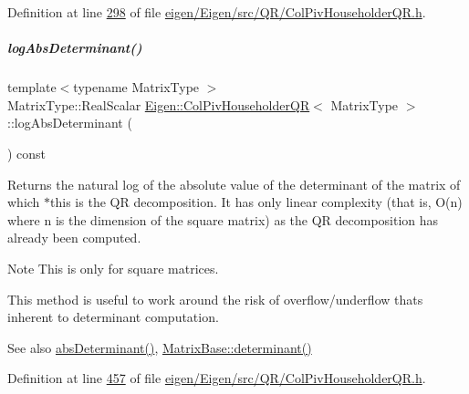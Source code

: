 Definition at line \hyperlink{eigen_2_eigen_2src_2_q_r_2_col_piv_householder_q_r_8h_source_l00298}{298} of file \hyperlink{eigen_2_eigen_2src_2_q_r_2_col_piv_householder_q_r_8h_source}{eigen/\+Eigen/src/\+Q\+R/\+Col\+Piv\+Householder\+Q\+R.\+h}.

\mbox{\label{group___q_r___module_afdc29438a335871f67449c253369ce12}} 
\subparagraph{\texorpdfstring{log\+Abs\+Determinant()}{logAbsDeterminant()}\hspace{0.1cm}{\footnotesize\ttfamily [1/2]}}
{\footnotesize\ttfamily template$<$typename Matrix\+Type $>$ \\
Matrix\+Type\+::\+Real\+Scalar \hyperlink{group___q_r___module_class_eigen_1_1_col_piv_householder_q_r}{Eigen\+::\+Col\+Piv\+Householder\+QR}$<$ Matrix\+Type $>$\+::log\+Abs\+Determinant (\begin{DoxyParamCaption}{ }\end{DoxyParamCaption}) const}

\begin{DoxyReturn}{Returns}
the natural log of the absolute value of the determinant of the matrix of which $\ast$this is the QR decomposition. It has only linear complexity (that is, O(n) where n is the dimension of the square matrix) as the QR decomposition has already been computed.
\end{DoxyReturn}
\begin{DoxyNote}{Note}
This is only for square matrices.

This method is useful to work around the risk of overflow/underflow that\textquotesingle{}s inherent to determinant computation.
\end{DoxyNote}
\begin{DoxySeeAlso}{See also}
\hyperlink{group___q_r___module_ac87c3bf42098d6f7324dafbc50fa83f7}{abs\+Determinant()}, \hyperlink{group___core___module_a7ad8f77004bb956b603bb43fd2e3c061}{Matrix\+Base\+::determinant()} 
\end{DoxySeeAlso}


Definition at line \hyperlink{eigen_2_eigen_2src_2_q_r_2_col_piv_householder_q_r_8h_source_l00457}{457} of file \hyperlink{eigen_2_eigen_2src_2_q_r_2_col_piv_householder_q_r_8h_source}{eigen/\+Eigen/src/\+Q\+R/\+Col\+Piv\+Householder\+Q\+R.\+h}.

